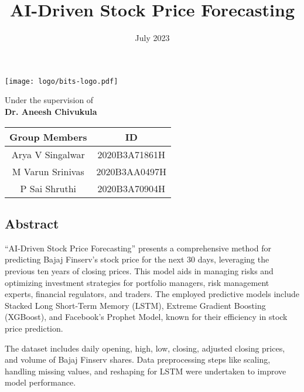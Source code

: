 \documentclass[12pt]{article}
\title{\Huge \textbf{AI-Driven Stock Price Forecasting}\vspace{-2em}}
\date{\LARGE July 2023}
\begin{document}
\maketitle
{\par}
\vspace{0.25in}
\thispagestyle{empty}
\begin{center}
    \texttt{[image: logo/bits-logo.pdf]}\\
\end{center}
\vspace{0.25in}
{\centering \LARGE{Under the supervision of\\ \textbf{Dr. Aneesh Chivukula}}\par}
\vspace{.1in}
{\centering
\begin{table}[b]
    {\centering \LARGE
    \begin{tabular}{|c|c|} \hline \centering
        \textbf{Group Members} & \textbf{ID}\\\hline
        Arya V Singalwar& 2020B3A71861H \\\hline
        M Varun Srinivas  & 2020B3AA0497H\\
        \hline \centering
        P Sai Shruthi & 2020B3A70904H\\
        \hline
    \end{tabular}\par}
\end{table}\par}
\pagebreak

\begin{center}
    \section*{\LARGE Abstract}
\end{center}
“AI-Driven Stock Price Forecasting” presents a comprehensive method for predicting Bajaj Finserv's stock price for the next 30 days, leveraging the previous ten years of closing prices. This model aids in managing risks and optimizing investment strategies for portfolio managers, risk management experts, financial regulators, and traders. The employed predictive models include Stacked Long Short-Term Memory (LSTM), Extreme Gradient Boosting (XGBoost), and Facebook's Prophet Model, known for their efficiency in stock price prediction.

The dataset includes daily opening, high, low, closing, adjusted closing prices, and volume of Bajaj Finserv shares. Data preprocessing steps like scaling, handling missing values, and reshaping for LSTM were undertaken to improve model performance.
\end{document}
